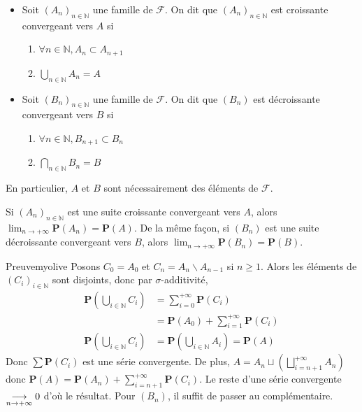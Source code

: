     \begin{defi}{}{}
        \begin{itemize}
            \item Soit $(A_n)_{n \in \mathbb{N}}$ une famille de $\mathcal{F}$. On dit que $(A_n)_{n \in \mathbb{N}}$ est croissante convergeant vers $A$ si 
            \begin{enumerate}
                \item $\forall n \in \mathbb{N}, A_n \subset A_{n +1}$
                \item $\bigcup_{n \in \mathbb{N}} A_n = A$
            \end{enumerate}
            \item Soit $(B_n)_{n \in \mathbb{N}}$ une famille de $\mathcal{F}$. On dit que $(B_n)$ est décroissante convergeant vers $B$ si 
            \begin{enumerate}
                \item $\forall n \in \mathbb{N}, B_{n+1} \subset B_n$
                \item $\bigcap_{n \in \mathbb{N}} B_n = B$
            \end{enumerate}
        \end{itemize}
        En particulier, $A$ et $B$ sont nécessairement des éléments de $\mathcal{F}$.
    \end{defi}

    \begin{prop}{}{}
        Si $(A_n)_{n \in \mathbb{N}}$ est une suite croissante convergeant vers $A$, alors $\lim_{n \to +\infty} \mathbf{P}(A_n) = \mathbf{P}(A)$. De la même façon, si $(B_n)$ est une suite décroissante convergeant vers $B$, alors $\lim_{n \to +\infty} \mathbf{P}(B_n) = \mathbf{P}(B)$.
    \end{prop}

    \begin{demo}{Preuve}{myolive}
        Posons $C_0 = A_0$ et $C_n = A_n \backslash A_{n -1}$ si $n \geq 1$. Alors les éléments de $(C_i)_{i \in \mathbb{N}}$ sont disjoints, donc par $\sigma$-additivité, 
        \begin{align*}
            \mathbf{P}\left(\bigcup_{i \in \mathbb{N}} C_i\right) 
            &= \sum_{i = 0}^{+\infty} \mathbf{P}(C_i) \\
            &= \mathbf{P}(A_0) + \sum_{i=1}^{+\infty} \mathbf{P}(C_i) \\
            \mathbf{P}\left(\bigcup_{i \in \mathbb{N}} C_i\right) &= \mathbf{P}\left(\bigcup_{i \in \mathbb{N}} A_i\right) = \mathbf{P}(A)
        \end{align*}
        Donc $\sum \mathbf{P}(C_i)$ est une série convergente. De plus, $A = A_n \sqcup \left(\bigsqcup_{i = n+1}^{+\infty} A_n\right)$ donc $\mathbf{P}(A) = \mathbf{P}(A_n) + \sum_{i =n+1}^{+\infty} \mathbf{P}(C_i)$. Le reste d’une série convergente $\underset{n \rightarrow +\infty}{\longrightarrow} 0$ d’où le résultat. Pour $(B_n)$, il suffit de passer au complémentaire.
    \end{demo}

